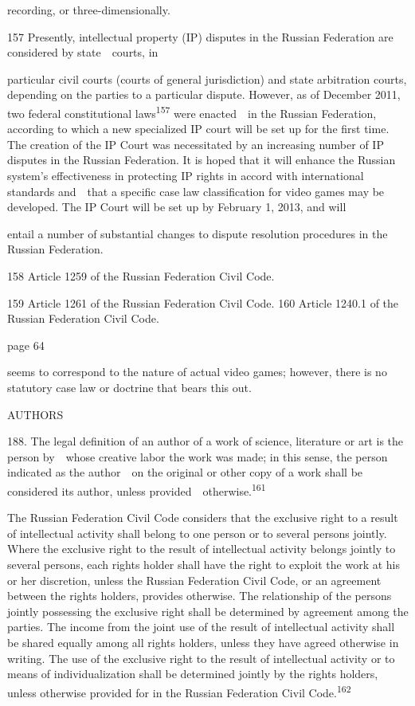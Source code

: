 \documentclass[
]{article}
\begin{document}
{recording, or three-dimensionally.}

{157 }{Presently, intellectual property (IP) disputes in the Russian
Federation are considered by state~~courts, in}

{particular civil courts (courts of general jurisdiction) and state
arbitration courts, depending on the parties to a particular dispute.
However, as of December 2011, two federal constitutional
laws}\textsuperscript{{157 }}{were enacted~~in the Russian Federation,
according to which a new specialized IP court will be set up for the
first time. The creation of the IP Court was necessitated by an
increasing number of IP disputes in the Russian Federation. It is hoped
that it will enhance the Rus}{sian system's effectiveness in protecting
}{IP rights in accord with international standards and~~that a specific
case law classification for video games may be developed. The IP Court
will be set up by February 1, 2013, and will}

{entail a number of substantial changes to dispute resolution procedures
in the Russian Federation.}

{158 }{Article 1259 of the Russian Federation }{Civil Code}{.}

{159 }{Article 1261 of the Russian Federation }{Civil Code}{. }{160
}{Article 1240.1 of the Russian Federation }{Civil Code.}

{page 64}

{seems to correspond to the nature of actual video games; however, there
is no statutory case law or doctrine that bears this out.}

{AUTHORS}

{188. }{The legal definition of an author of a work of science,
literature or art is the person by~~whose creative labor the work was
made; in this sense, the person indicated as the author~~on the original
or other copy of a work shall be considered its author, unless
provided~~otherwise.}\textsuperscript{{161}}

{The Russian Federation }{Civil Code }{considers that the exclusive
right to a result of intellectual activity shall belong to one person or
to several persons jointly. Where the exclusive right to the result of
intellectual activity belongs jointly to several persons, each rights
holder shall have the right to exploit the work at his or her
discretion, unless the Russian Federation }{Civil Code}{, or an
agreement between the rights holders, provides otherwise. The
relationship of the persons jointly possessing the exclusive right shall
be determined by agreement among the parties. The income from the joint
use of the result of intellectual activity shall be shared equally among
all rights holders, unless they have agreed otherwise in writing. The
use of the exclusive right to the result of intellectual activity or to
means of individualization shall be determined jointly by the rights
holders, unless otherwise provided for in the Russian Federation }{Civil
Code.}\textsuperscript{{162}}
\end{document}
